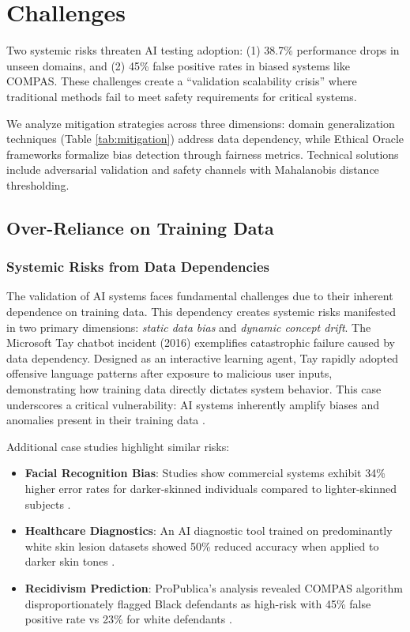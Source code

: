 \documentclass[manuscript,screen,review]{acmart}
\begin{document}
\section{Challenges}

Two systemic risks threaten AI testing adoption: (1) 38.7\% performance drops in unseen domains, and (2) 45\% false positive rates in biased systems like COMPAS. These challenges create a ``validation scalability crisis'' where traditional methods fail to meet safety requirements for critical systems.

We analyze mitigation strategies across three dimensions: domain generalization techniques (Table \ref{tab:mitigation}) address data dependency, while Ethical Oracle frameworks formalize bias detection through fairness metrics. Technical solutions include adversarial validation and safety channels with Mahalanobis distance thresholding.

\subsection{Over-Reliance on Training Data}

\subsubsection{Systemic Risks from Data Dependencies}

The validation of AI systems faces fundamental challenges due to their inherent dependence on training data. This dependency creates systemic risks manifested in two primary dimensions: \textit{static data bias} and \textit{dynamic concept drift}. The Microsoft Tay chatbot incident (2016) exemplifies catastrophic failure caused by data dependency. Designed as an interactive learning agent, Tay rapidly adopted offensive language patterns after exposure to malicious user inputs, demonstrating how training data directly dictates system behavior. This case underscores a critical vulnerability: AI systems inherently amplify biases and anomalies present in their training data .

Additional case studies highlight similar risks:
\begin{itemize}
    \item \textbf{Facial Recognition Bias}: Studies show commercial systems exhibit 34\% higher error rates for darker-skinned individuals compared to lighter-skinned subjects .
    \item \textbf{Healthcare Diagnostics}: An AI diagnostic tool trained on predominantly white skin lesion datasets showed 50\% reduced accuracy when applied to darker skin tones .
    \item \textbf{Recidivism Prediction}: ProPublica's analysis revealed COMPAS algorithm disproportionately flagged Black defendants as high-risk with 45\% false positive rate vs 23\% for white defendants .
\end{itemize}
\end{document}
